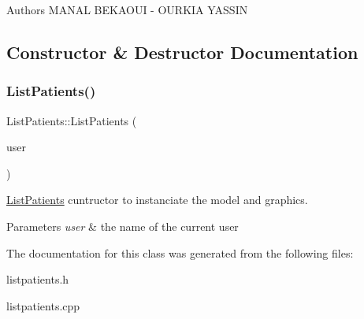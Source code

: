 \begin{DoxyAuthor}{Authors}
M\+A\+N\+AL B\+E\+K\+A\+O\+UI -\/ O\+U\+R\+K\+IA Y\+A\+S\+S\+IN 
\end{DoxyAuthor}


\subsection{Constructor \& Destructor Documentation}
\mbox{\label{class_list_patients_a71c7d5fe4535c6f9b1d3c8f313902053}} 
\subsubsection{\texorpdfstring{ListPatients()}{ListPatients()}}
{\footnotesize\ttfamily List\+Patients\+::\+List\+Patients (\begin{DoxyParamCaption}\item[{Q\+String}]{user }\end{DoxyParamCaption})\hspace{0.3cm}{\ttfamily [explicit]}}



\mbox{\hyperlink{class_list_patients}{List\+Patients}} cuntructor to instanciate the model and graphics. 


\begin{DoxyParams}{Parameters}
{\em user} & the name of the current user \\
\hline
\end{DoxyParams}


The documentation for this class was generated from the following files\+:\begin{DoxyCompactItemize}
\item 
listpatients.\+h\item 
listpatients.\+cpp\end{DoxyCompactItemize}

